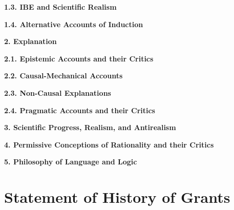 \documentclass{article}[11pt]
\begin{document}
\textbf{1.3. IBE and Scientific Realism}

\printbibliography[keyword=IBE_Sci_Realism]

\textbf{1.4. Alternative Accounts of Induction}

\printbibliography[keyword=Induction]

\textbf{{\large 2. Explanation}}\vspace{3mm}

\textbf{2.1. Epistemic Accounts and their Critics}

\printbibliography[keyword=Epistem_Expl]

\textbf{2.2. Causal-Mechanical Accounts}

\printbibliography[keyword=Causal-Mechanical]

\textbf{2.3. Non-Causal Explanations}

\printbibliography[keyword=Non-Causal]

\textbf{2.4. Pragmatic Accounts and their Critics}

\printbibliography[keyword=Pragmatic]

\textbf{{\large 3. Scientific Progress, Realism, and Antirealism}}

\printbibliography[keyword=Realism]

\textbf{{\large 4. Permissive Conceptions of Rationality and their Critics}}

\printbibliography[keyword=permissivism]


\textbf{{\large 5. Philosophy of Language and Logic}}

\printbibliography[keyword=Language_and_Logic]

\clearpage
\section{Statement of History of Grants}




\clearpage
\end{document}
